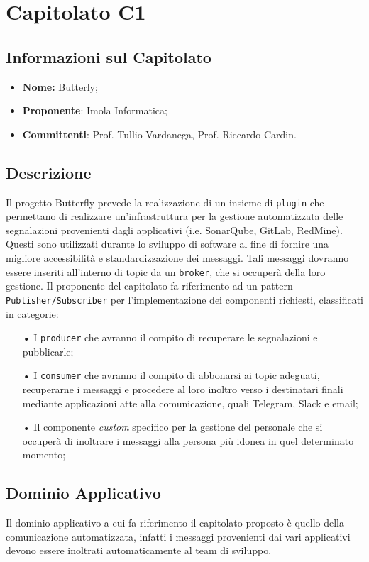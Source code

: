 \section{Capitolato C1}
\subsection{Informazioni sul Capitolato}
\begin{itemize}
	\item \textbf{Nome:} Butterly;
	\item \textbf{Proponente}: Imola Informatica;
	\item \textbf{Committenti}: Prof. Tullio Vardanega, Prof. Riccardo Cardin.
\end{itemize}

\subsection{Descrizione}
Il progetto Butterfly prevede la realizzazione di un insieme di \texttt{plugin} che permettano di realizzare un'infrastruttura per la gestione automatizzata delle segnalazioni provenienti dagli applicativi (i.e. SonarQube, GitLab, RedMine). Questi sono utilizzati durante lo sviluppo di software al fine di fornire una migliore accessibilità e standardizzazione dei messaggi. Tali messaggi dovranno essere inseriti all'interno di topic da un \texttt{broker}, che si occuperà della loro gestione. Il proponente del capitolato fa riferimento ad un pattern \texttt{Publisher/Subscriber} per l'implementazione dei componenti richiesti, classificati in categorie:
\begin{itemize}
\item[•]I \texttt{producer} che avranno il compito di recuperare le segnalazioni e pubblicarle;
\item[•] I \texttt{consumer} che avranno il compito di abbonarsi ai topic adeguati, recuperarne i messaggi e procedere al loro inoltro verso i destinatari finali mediante applicazioni atte alla comunicazione, quali Telegram, Slack e email;
\item[•]Il componente \textit{custom} specifico per la gestione del personale che si occuperà di inoltrare i messaggi alla persona più idonea in quel determinato momento;
\end{itemize}
\subsection{Dominio Applicativo}
Il dominio applicativo a cui fa riferimento il capitolato proposto è quello della comunicazione automatizzata, infatti i messaggi provenienti dai vari applicativi devono essere inoltrati automaticamente al team di sviluppo.
